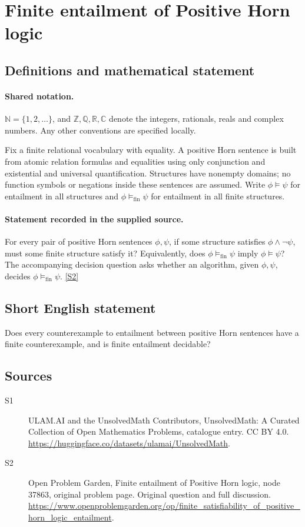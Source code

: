\documentclass[11pt]{article}
\newcommand{\sref}[2]{\hyperlink{source:#1:#2}{[S#2]}}
\begin{document}
\section{Finite entailment of Positive Horn logic}\label{statement}

\subsection{Definitions and mathematical statement}

\paragraph{Shared notation.}$\mathbb N=\{1,2,\ldots\}$, and $\mathbb Z,\mathbb Q,\mathbb R,\mathbb C$ denote the integers, rationals, reals and complex numbers. Any other conventions are specified locally.


Fix a finite relational vocabulary with equality. A positive Horn sentence is built from atomic relation formulas and equalities using only conjunction and existential and universal quantification. Structures have nonempty domains; no function symbols or negations inside these sentences are assumed. Write $\phi\models\psi$ for entailment in all structures and $\phi\models_{\mathrm{fin}}\psi$ for entailment in all finite structures.
\paragraph{Statement recorded in the supplied source.}
For every pair of positive Horn sentences $\phi,\psi$, if some structure satisfies $\phi\wedge\neg\psi$, must some finite structure satisfy it? Equivalently, does $\phi\models_{\mathrm{fin}}\psi$ imply $\phi\models\psi$? The accompanying decision question asks whether an algorithm, given $\phi,\psi$, decides $\phi\models_{\mathrm{fin}}\psi$. \sref{statement}{2}
\subsection{Short English statement}
Does every counterexample to entailment between positive Horn sentences have a finite counterexample, and is finite entailment decidable?
\subsection{Sources}
\begin{description}
\item[\hypertarget{source:statement:1}{S1}] ULAM.AI and the UnsolvedMath Contributors, UnsolvedMath: A Curated Collection of Open Mathematics Problems, catalogue entry. CC BY 4.0. \url{https://huggingface.co/datasets/ulamai/UnsolvedMath}.
\item[\hypertarget{source:statement:2}{S2}] Open Problem Garden, Finite entailment of Positive Horn logic, node 37863, original problem page. Original question and full discussion. \url{https://www.openproblemgarden.org/op/finite_satisfiability_of_positive_horn_logic_entailment}.

\end{description}
\label{end:statement}
\end{document}
